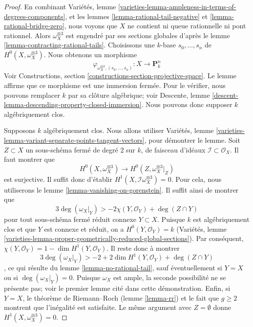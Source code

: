 \begin{proof}
En combinant Variétés, lemme \ref{varieties-lemma-ampleness-in-terms-of-degrees-components}, et les lemmes \ref{lemma-rational-tail-negative} et \ref{lemma-rational-bridge-zero}, nous voyons que $X$ ne contient ni queue rationnelle ni pont rationnel. Alors $\omega_X^{\otimes 3}$ est engendré par ses sections globales d'après le lemme \ref{lemma-contracting-rational-tails}. Choisissons une $k$-base $s_0, \ldots, s_n$ de $H^0(X, \omega_X^{\otimes 3})$. Nous obtenons un morphisme $$
\varphi_{\omega_X^{\otimes 3}, (s_0, \ldots, s_n)} :
X \longrightarrow \mathbf{P}^n_k
$$ Voir Constructions, section \ref{constructions-section-projective-space}. Le lemme affirme que ce morphisme est une immersion fermée. Pour le vérifier, nous pouvons remplacer $k$ par sa clôture algébrique; voir Descente, lemme \ref{descent-lemma-descending-property-closed-immersion}. Nous pouvons donc supposer $k$ algébriquement clos.

\medskip\noindent
Supposons $k$ algébriquement clos. Nous allons utiliser Variétés, lemme \ref{varieties-lemma-variant-separate-points-tangent-vectors}, pour démontrer le lemme. Soit $Z \subset X$ un sous-schéma fermé de degré $2$ sur $k$, de faisceau d'idéaux $\mathcal{I} \subset \mathcal{O}_X$. Il faut montrer que $$
H^0(X, \omega_X^{\otimes 3}) \to H^0(Z, \omega_X^{\otimes 3}|_Z)
$$ est surjective. Il suffit donc d'établir $H^1(X, \mathcal{I}\omega_X^{\otimes 3}) = 0$. Pour cela, nous utiliserons le lemme \ref{lemma-vanishing-on-gorenstein}. Il suffit ainsi de montrer que $$
3\deg(\omega_X|_Y) > -2\chi(Y, \mathcal{O}_Y) + \deg(Z \cap Y)
$$ pour tout sous-schéma fermé réduit connexe $Y \subset X$. Puisque $k$ est algébriquement clos et que $Y$ est connexe et réduit, on a $H^0(Y, \mathcal{O}_Y) = k$ (Variétés, lemme \ref{varieties-lemma-proper-geometrically-reduced-global-sections}). Par conséquent, $\chi(Y, \mathcal{O}_Y) = 1 - \dim H^1(Y, \mathcal{O}_Y)$. Il reste donc à montrer $$
3\deg(\omega_X|_Y) > -2 + 2\dim H^1(Y, \mathcal{O}_Y) + \deg(Z \cap Y)
$$, ce qui résulte du lemme \ref{lemma-no-rational-tail}, sauf éventuellement si $Y = X$ ou si $\deg(\omega_X|_Y) = 0$. Puisque $\omega_X$ est ample, la seconde possibilité ne se présente pas; voir le premier lemme cité dans cette démonstration. Enfin, si $Y = X$, le théorème de Riemann--Roch (lemme \ref{lemma-rr}) et le fait que $g \geq 2$ montrent que l'inégalité est satisfaite. Le même argument avec $Z = \emptyset$ donne $H^1(X, \omega_X^{\otimes 3}) = 0$.
\end{proof}







